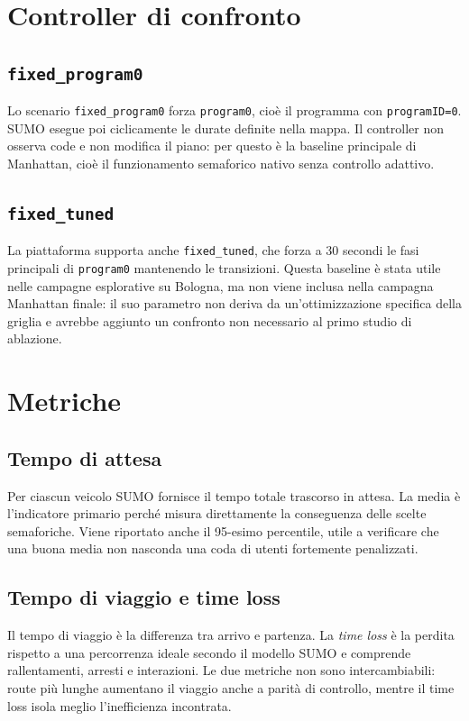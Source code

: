 \documentclass[12pt,a4paper,oneside]{report}
\numberwithin{equation}{chapter}
\begin{document}
\section{Controller di confronto}

\subsection{\texttt{fixed\_program0}}

Lo scenario \texttt{fixed\_program0} forza \texttt{program0}, cioè il programma
con \texttt{programID=0}. SUMO esegue poi ciclicamente le durate definite nella
mappa. Il controller non osserva code e non modifica il piano: per questo è la
baseline principale di Manhattan, cioè il funzionamento semaforico nativo senza
controllo adattivo.

\subsection{\texttt{fixed\_tuned}}

La piattaforma supporta anche \texttt{fixed\_tuned}, che forza a 30 secondi le
fasi principali di \texttt{program0} mantenendo le transizioni. Questa baseline è
stata utile nelle campagne esplorative su Bologna, ma non viene inclusa nella
campagna Manhattan finale: il suo parametro non deriva da un'ottimizzazione
specifica della griglia e avrebbe aggiunto un confronto non necessario al
primo studio di ablazione.

\section{Metriche}

\subsection{Tempo di attesa}

Per ciascun veicolo SUMO fornisce il tempo totale trascorso in attesa. La media
è l'indicatore primario perché misura direttamente la conseguenza delle scelte
semaforiche. Viene riportato anche il 95-esimo percentile, utile a verificare
che una buona media non nasconda una coda di utenti fortemente penalizzati.

\subsection{Tempo di viaggio e time loss}

Il tempo di viaggio è la differenza tra arrivo e partenza. La \emph{time loss}
è la perdita rispetto a una percorrenza ideale secondo il modello SUMO e
comprende rallentamenti, arresti e interazioni. Le due metriche non sono
intercambiabili: route più lunghe aumentano il viaggio anche a parità di
controllo, mentre il time loss isola meglio l'inefficienza incontrata.
\end{document}
